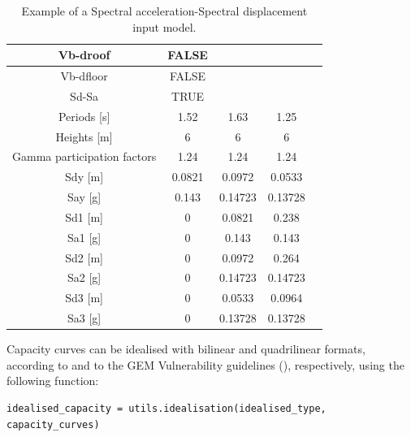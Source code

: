 \begin {table}[htb]
\caption{Example of a Spectral acceleration-Spectral displacement input model.}
\label{table:Sa-Sd_input}
\begin{center}
  \begin{tabular}{ | c | c | c | c | c |}
  \hline
	Vb-droof &	FALSE & &  \\ \hline
	Vb-dfloor & 	FALSE & & \\ \hline
	Sd-Sa &	TRUE & & \\ \hline
	Periods [s] &	1.52 &	1.63 &	1.25 \\ \hline
	Heights [m]	& 6 &	6	& 6 \\ \hline
	Gamma participation factors	& 1.24 &	1.24 &	1.24 \\ \hline
	Sdy [m] & 	0.0821 & 	0.0972 &	0.0533\\ \hline
	Say [g]	& 0.143	& 0.14723	& 0.13728 \\ \hline
	Sd1 [m]	& 0 &	0.0821	& 0.238 \\ \hline
	Sa1 [g]	& 0	& 0.143	& 0.143 \\ \hline
	Sd2 [m] &	0 & 0.0972	& 0.264 \\ \hline
	Sa2 [g]	& 0	& 0.14723	& 0.14723 \\ \hline
	Sd3 [m]	& 0	& 0.0533	& 0.0964 \\ \hline
	Sa3 [g]	& 0	& 0.13728	& 0.13728 \\ \hline
  \end{tabular}
\end{center}
\end{table}

Capacity curves can be idealised with bilinear and quadrilinear formats, according to \citep{FEMA4402005} and to the GEM Vulnerability guidelines (\citep{Dayala2014}), respectively, using the following function:

\begin{Verbatim}[frame=single, commandchars=\\\{\}, samepage=true]
idealised_capacity = utils.idealisation(idealised_type, capacity_curves)
\end{Verbatim}